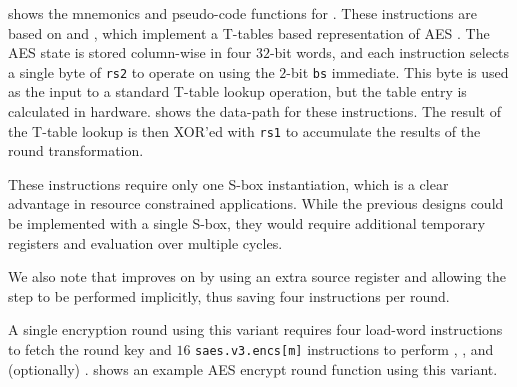 
 shows the mnemonics and pseudo-code functions
for .
These instructions are based on
\cite{NadIkeKur:04,BBFR:06} and \cite{Saarinen:20},
which implement a T-tables based representation of AES \cite{DaeRij:02}.
The AES state is stored column-wise in four $32$-bit words, and
each instruction selects a single byte of {\tt rs2} to operate on
using the $2$-bit {\tt bs} immediate.
This byte is used as the input to a standard T-table lookup operation,
but the table entry is calculated in hardware.
 shows the data-path for these instructions.
The result of the T-table lookup is then XOR'ed with {\tt rs1} to
accumulate the results of the round transformation.

These instructions require only one S-box instantiation,
which is a clear advantage in resource constrained applications.
While the previous designs could be implemented with a single S-box, they
would require additional temporary registers and evaluation over multiple
cycles.

We also note that \cite{Saarinen:20} improves on \cite{BBFR:06}
by using an extra source register and allowing the  step to be
performed implicitly, thus saving four instructions per round.

A single encryption round using this variant requires
four load-word instructions to fetch the round key and
$16$ {\tt saes.v3.encs[m]} instructions to perform ,
,  and (optionally) .
 shows an example AES encrypt round function
using this variant.

